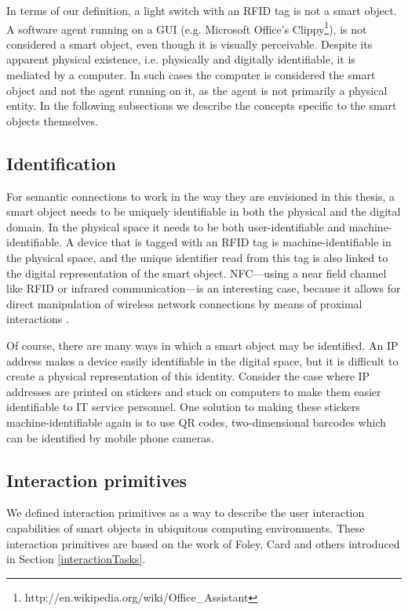  In terms of our definition, a light switch with an \ac{RFID} tag is not a smart object. A software agent running on a \ac{GUI} (e.g. Microsoft Office's Clippy\footnote{http://en.wikipedia.org/wiki/Office\_Assistant}), is not considered a smart object, even though it is visually perceivable. Despite its apparent physical existence, i.e. physically and digitally identifiable, it is mediated by a computer. In such cases the computer is considered the smart object and not the agent running on it, as the agent is not primarily a physical entity. In the following subsections we describe the concepts specific to the smart objects themselves.

\subsection{Identification}
\label{Identification}
For semantic connections to work in the way they are envisioned in this thesis, a smart object needs to be uniquely identifiable in both the physical and the digital domain. In the physical space it needs to be both user-identifiable and machine-identifiable. A device that is tagged with an \ac{RFID} tag is machine-identifiable in the physical space, and the unique identifier read from this tag is also linked to the digital representation of the smart object. \ac{NFC}---using a near field channel like \ac{RFID} or infrared communication---is an interesting case, because it allows for direct manipulation of wireless network connections by means of proximal interactions \cite{Rekimoto2003}.

Of course, there are many ways in which a smart object may be identified. An IP address makes a device easily identifiable in the digital space, but it is difficult to create a physical representation of this identity. Consider the case where IP addresses are printed on stickers and stuck on computers to make them easier identifiable to IT service personnel. One solution to making these stickers machine-identifiable again is to use \ac{QR} codes, two-dimensional barcodes which can be identified by mobile phone cameras.

\subsection{Interaction primitives}
\label{InteractionPrimitives}

We defined interaction primitives as a way to describe the user interaction capabilities of smart objects in ubiquitous computing environments.  These interaction primitives are based on the work of Foley, Card and others introduced in Section \ref{interactionTasks}.

